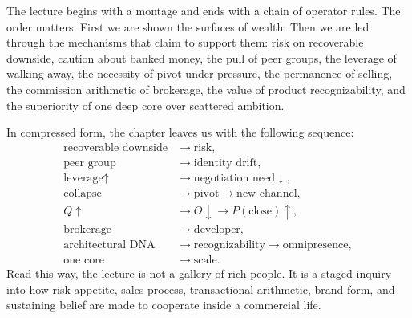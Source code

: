 The lecture begins with a montage and ends with a chain of operator rules. The order matters. First we are shown the surfaces of wealth. Then we are led through the mechanisms that claim to support them: risk on recoverable downside, caution about banked money, the pull of peer groups, the leverage of walking away, the necessity of pivot under pressure, the permanence of selling, the commission arithmetic of brokerage, the value of product recognizability, and the superiority of one deep core over scattered ambition.

In compressed form, the chapter leaves us with the following sequence:
\begin{align}
\text{recoverable downside} &\to \text{risk}, \\
\text{peer group} &\to \text{identity drift}, \\
\text{leverage}\uparrow &\to \text{negotiation need}\downarrow, \\
\text{collapse} &\to \text{pivot} \to \text{new channel}, \\
Q\uparrow &\to O\downarrow \to P(\text{close})\uparrow, \\
\text{brokerage} &\to \text{developer}, \\
\text{architectural DNA} &\to \text{recognizability} \to \text{omnipresence}, \\
\text{one core} &\to \text{scale}.
\end{align}
Read this way, the lecture is not a gallery of rich people. It is a staged inquiry into how risk appetite, sales process, transactional arithmetic, brand form, and sustaining belief are made to cooperate inside a commercial life.